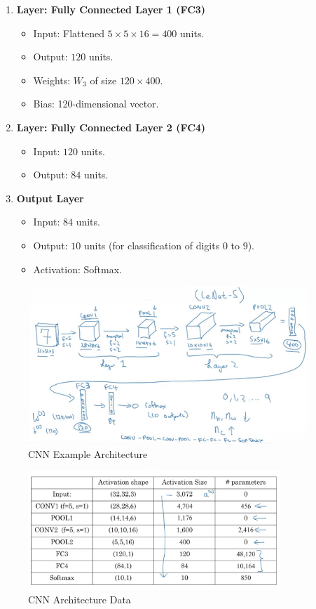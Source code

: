\documentclass[letterpaper,12pt,notitlepage,twoside]{report}
\begin{document}
\begin{enumerate}[nosep]
    \item \textbf{Layer: Fully Connected Layer 1 (FC3)}
    \begin{itemize}
        \item Input: Flattened $5 \times 5 \times 16 = 400$ units.
        \item Output: $120$ units.
        \item Weights: $W_3$ of size $120 \times 400$.
        \item Bias: 120-dimensional vector.
    \end{itemize}

    \item \textbf{Layer: Fully Connected Layer 2 (FC4)}
    \begin{itemize}
        \item Input: $120$ units.
        \item Output: $84$ units.
    \end{itemize}

    \item \textbf{Output Layer}
    \begin{itemize}
        \item Input: $84$ units.
        \item Output: $10$ units (for classification of digits $0$ to $9$).
        \item Activation: Softmax.
    \end{itemize}
\end{enumerate}

\begin{figure}[h]
	\centering
	\includegraphics[width=0.95\textwidth]{Images/CNN Example.png}
	\caption{CNN Example Architecture}
	\label{fig:30}
\end{figure}

\begin{figure}[h]
	\centering
	\includegraphics[width=0.85\textwidth]{Images/CNN Data.png}
	\caption{CNN Architecture Data}
	\label{fig:31}
\end{figure}
\end{document}
